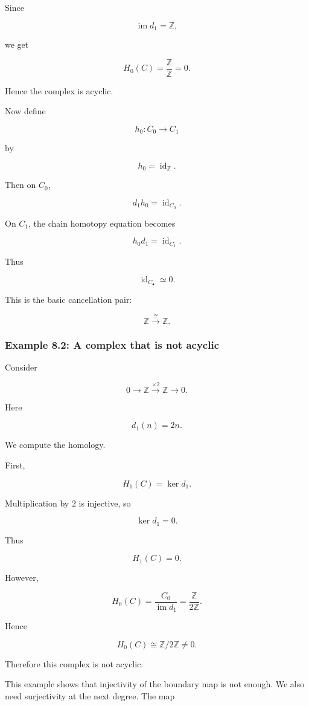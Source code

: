 \documentclass[12pt,a4paper]{article}
\theoremstyle{notespace}
\begin{document}
Since

\[
\operatorname{im} d_1=\mathbb Z,
\]

we get

\[
H_0(C)=\frac{\mathbb Z}{\mathbb Z}=0.
\]

Hence the complex is acyclic.

Now define

\[
h_0\colon C_0\to C_1
\]

by

\[
h_0=\operatorname{id}_{\mathbb Z}.
\]

Then on \(C_0\),

\[
d_1h_0=\operatorname{id}_{C_0}.
\]

On \(C_1\), the chain homotopy equation becomes

\[
h_0d_1=\operatorname{id}_{C_1}.
\]

Thus

\[
\operatorname{id}_{C_\bullet}\simeq 0.
\]

This is the basic cancellation pair:

\[
\mathbb Z \xrightarrow{\cong} \mathbb Z.
\]

\subsubsection{Example 8.2: A complex that is not acyclic}

Consider

\[
0\longrightarrow \mathbb Z
\xrightarrow{\times 2}
\mathbb Z
\longrightarrow 0.
\]

Here

\[
d_1(n)=2n.
\]

We compute the homology.

First,

\[
H_1(C)=\ker d_1.
\]

Multiplication by \(2\) is injective, so

\[
\ker d_1=0.
\]

Thus

\[
H_1(C)=0.
\]

However,

\[
H_0(C)=\frac{C_0}{\operatorname{im}d_1}
=
\frac{\mathbb Z}{2\mathbb Z}.
\]

Hence

\[
H_0(C)\cong \mathbb Z/2\mathbb Z\neq 0.
\]

Therefore this complex is not acyclic.

This example shows that injectivity of the boundary map is not enough. We also need surjectivity at the next degree. The map
\end{document}
